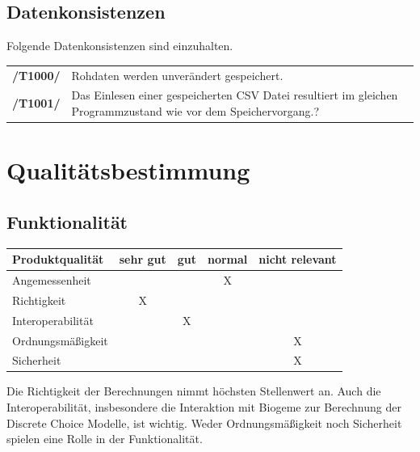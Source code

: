 \documentclass{article}
\begin{document}
\subsection{Datenkonsistenzen}
Folgende Datenkonsistenzen sind einzuhalten.
\begin{table}[H]
\begin{tabularx}{\textwidth}{rX}
\textbf{/T1000/}        & Rohdaten werden unverändert gespeichert. \\              \textbf{/T1001/}        & Das Einlesen einer gespeicherten CSV Datei resultiert im gleichen Programmzustand wie vor dem Speichervorgang.? \\
\end{tabularx}
\end{table}

\section{Qualitätsbestimmung}
\subsection{Funktionalität}
\begin{table}[H]
\centering
\begin{tabular}{lcccc}
\hline
\textbf{Produktqualität} & sehr gut & gut & normal & nicht relevant \\ \hline
Angemessenheit           &          &     & X      &                \\
Richtigkeit              & X        &     &        &                \\
Interoperabilität        &          & X   &        &                \\
Ordnungsmäßigkeit        &          &     &        & X              \\
Sicherheit               &          &     &        & X              \\  
\end{tabular}
\end{table}
Die Richtigkeit der Berechnungen nimmt höchsten Stellenwert an. Auch die Interoperabilität, insbesondere die Interaktion mit Biogeme zur Berechnung der Discrete Choice Modelle, ist wichtig. Weder Ordnungsmäßigkeit noch Sicherheit spielen eine Rolle in der Funktionalität.
\end{document}
